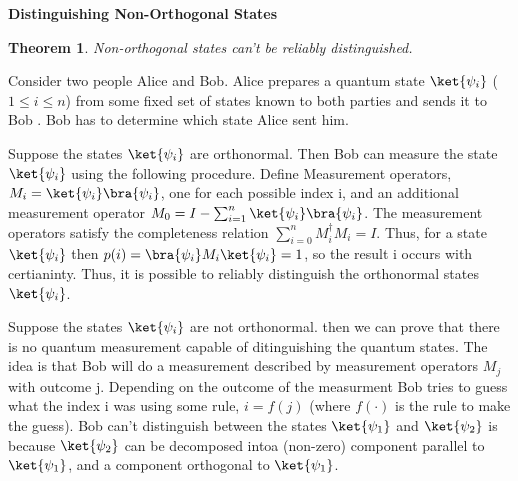 \documentclass[12pt, oneside]{book}
\newtheorem{theorem}{Theorem}[section]
\theoremstyle{definition}
\theoremstyle{definition}
\theoremstyle{remark}
\begin{document}
\begin{importantnote}
    \textbf{Distinguishing Non-Orthogonal States}
    \begin{theorem}
        Non-orthogonal states can't be reliably distinguished.
    \end{theorem}
    Consider two people Alice and Bob. Alice prepares a quantum state $\ket{\psi_i}$ ($1\leq i\leq n$) from some fixed set of states known to both parties and sends it to Bob . Bob has to determine which state Alice sent him.

    Suppose the states $\ket{\psi_i}$ are orthonormal. Then Bob can measure the state $\ket{\psi_i}$ using the following procedure. Define Measurement operators, $M_i=\ket{\psi_i}\bra{\psi_i}$, one for each possible index i, and an additional 
    measurement operator $M_0=I-\sum_{i=1}^{n}\ket{\psi_i}\bra{\psi_i}$. The measurement operators satisfy the completeness relation $\sum_{i=0}^{n}M_i^{\dagger}M_i=I$. Thus, for a state $\ket{\psi_i}$ then $p(i)=\bra{\psi_i}M_i\ket{\psi_i}=1$, so the result i occurs
    with certianinty. Thus, it is possible to reliably distinguish the orthonormal states $\ket{\psi_i}$.

    Suppose the states $\ket{\psi_i}$ are not orthonormal. then we can prove that there is no quantum measurement 
    capable of ditinguishing the quantum states. The idea is that Bob will do a measurement described by measurement operators $M_j$ with 
    outcome j. Depending on the outcome of the measurment Bob tries to guess what the index i was using some rule,
    $i=f(j)$ (where $f(\cdot)$ is the rule to make the guess). Bob can't distinguish between the states $\ket{\psi_1}$ and $\ket{\psi_2}$ 
    is because $\ket{\psi_2}$ can be decomposed intoa (non-zero) component parallel to $\ket{\psi_1}$, and a component orthogonal to $\ket{\psi_1}$.
\end{importantnote}
\end{document}
